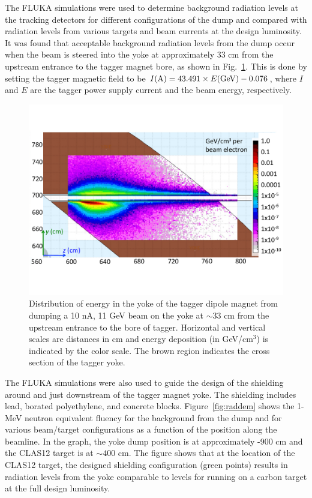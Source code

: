 The FLUKA simulations were used to determine background radiation levels at the tracking detectors for different configurations of the 
dump and compared with radiation levels from various targets and beam currents at the design luminosity.  It was found that acceptable 
background radiation levels from the dump occur when the beam is steered into the yoke at approximately 33 cm from the upstream 
entrance to the tagger magnet bore, as shown in Fig.~\ref{fig:yokedump}. This is done by setting the tagger magnetic field to be 
$I({\rm A}) = 43.491\times E({\rm GeV}) - 0.076$, where $I$ and $E$ are 
the tagger power supply current and the beam energy, respectively.   
%
\begin{figure}[hbt]
\begin{center}
\includegraphics[width=.45\textwidth]{YokeDump.pdf}
	\caption{Distribution of energy in the yoke of the tagger dipole magnet from dumping a 10 nA, 11 GeV beam on the yoke at 
	$\sim33$ cm from the upstream entrance to the bore of tagger. Horizontal and vertical scales are distances in cm and energy 
	deposition (in GeV/cm$^3$) is indicated by the color scale. The brown region indicates the cross section of the tagger yoke.}
\label{fig:yokedump}
\end{center}
\end{figure}

The FLUKA simulations were also used to guide the design of the shielding around and just downstream of the tagger magnet yoke. 
The shielding includes lead, borated polyethylene, and concrete blocks. Figure~\ref{fig:raddem} shows the 1-MeV neutron equivalent 
fluency for the background from the dump and for various beam/target configurations as a function of the position along the beamline. 
In the graph, the yoke dump position is at approximately -900 cm and the CLAS12 target is at $\sim400$ cm. The figure shows that at 
the location of the CLAS12 target, the designed shielding configuration (green points) results in radiation levels from the yoke 
comparable to levels for running on a carbon target at the full design luminosity.   

